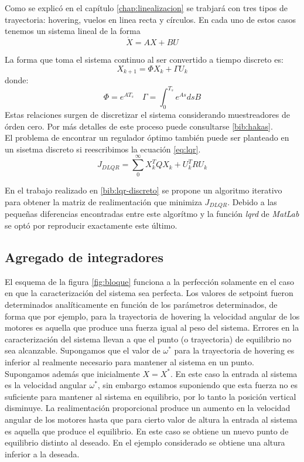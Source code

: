 \documentclass[main]{subfiles}
\begin{document}
Como se explic\'o en el cap\'itulo \ref{chap:linealizacion} se trabjar\'a con tres tipos de trayectoria: hovering, vuelos en linea recta y c\'irculos. En cada uno de estos casos tenemos un sistema lineal de la forma 
\begin{equation}
\dot{X} = A X + BU
\end{equation}
 
La forma que toma el sistema continuo al ser convertido a tiempo discreto es: 
\begin{equation}
X_{k+1} = \Phi X_k + \Gamma U_k
\end{equation}
donde:
\begin{equation}
\Phi = e^{AT_s} \quad \Gamma = \int_0^{T_s} e^{A s} ds B
\end{equation}
Estas relaciones surgen de discretizar el sistema considerando muestreadores de \'orden cero. Por m\'as detalles de este proceso puede consultarse \ref{bib:hakas}.\\

El problema de encontrar un regulador \'optimo tambi\'en puede ser planteado en un sisetma discreto si reescribimos la ecuaci\'on \ref{eq:lqr}. 
\begin{equation}
\label{eq:dlqr}
J_{DLQR} = \sum_0^\infty X_k^T Q X_k + U_k^T R U_k
\end{equation}

En el trabajo realizado en \ref{bib:lqr-discreto} se propone un algoritmo iterativo para obtener la matriz de realimentaci\'on que minimiza $J_{DLQR}$. Debido a las pequeñas diferencias encontradas entre este algor\'itmo y la funci\'on \emph{lqrd} de \emph{MatLab}  se opt\'o por reproducir exactamente este \'ultimo.

\subsection{Agregado de integradores}

El esquema de la figura \ref{fig:bloque} funciona a la perfecci\'on solamente en el caso en que la caracterizaci\'on del sistema sea perfecta. Los valores de setpoint fueron determinados anal\'iticamente en funci\'on de los par\'ametros determinados, de forma que por ejemplo, para la trayectoria de hovering la velocidad angular de los motores es aquella que produce una fuerza igual al peso del sistema. Errores en la caracterizaci\'on del sistema llevan a que el punto (o trayectoria) de equilibrio no sea alcanzable. Supongamos que el valor de $\omega^*$ para la trayectoria de hovering es inferior al realmente necesario para mantener al sistema en un punto. Supongamos adem\'as que inicialmente $X = X^*$. En este caso la entrada al sistema es la velocidad angular $\omega^*$, sin embargo estamos suponiendo que esta fuerza no es suficiente para mantener al sistema en equilibrio, por lo tanto la posici\'on vertical disminuye. La realimentaci\'on proporcional produce un aumento en la velocidad angular de los motores hasta que para cierto valor de altura la entrada al sistema es aquella que produce el equilibrio. En este caso se obtiene un nuevo punto de equilibrio distinto al deseado. En el ejemplo considerado se obtiene una altura inferior a la deseada. \\
\end{document}
